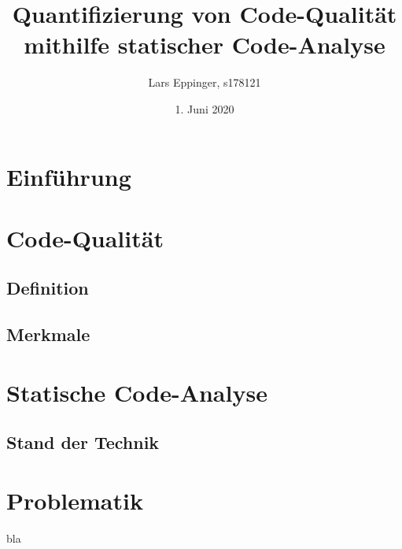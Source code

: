 \documentclass[a4paper, 12pt]{article}
\author{Lars Eppinger, s178121}
\title{Quantifizierung von Code-Qualität mithilfe statischer Code-Analyse}
\date{1. Juni 2020}
\begin{document}

\tableofcontents
\newpage

\section{Einführung}
\blindtext

\section{Code-Qualität}
\subsection{Definition}
\blindtext

\subsection{Merkmale}
\blindtext

\section{Statische Code-Analyse}
\subsection{Stand der Technik}

\section{Problematik}

bla \parencite{natural-language-processing}
\newpage
\printbibliography
\end{document}
